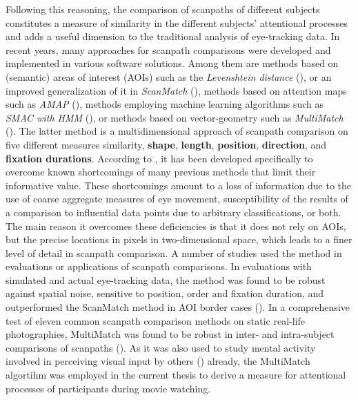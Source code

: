 \documentclass[a4paper, 12pt]{scrreprt}
\begin{document}
Following this reasoning, the comparison of scanpaths of different subjects constitutes a measure of similarity in the different subjects’ attentional processes and adds a useful dimension to the traditional analysis of eye-tracking data. \newline
In recent years, many approaches for scanpath comparisons were developed and implemented in various software solutions. Among them are methods based on (semantic) areas of interest (AOIs) such as the \textit{Levenshtein distance} (\cite{levenshtein1966binary}), or an improved generalization of it in \textit{ScanMatch} (\cite{cristino2010scanmatch}), methods based on attention maps such as \textit{AMAP} (\cite{ouerhani2004empirical}), methods employing machine learning algorithms such as \textit{SMAC with HMM} (\cite{coutrot2018scanpath}), or methods based on vector-geometry such as \textit{MultiMatch} (\cite{jarodzka2010vector}). The latter method is a multidimensional approach of scanpath comparison on five different measures similarity, \textbf{shape}, \textbf{length}, \textbf{position}, \textbf{direction}, and \textbf{fixation durations}. According to \textcite{jarodzka2010vector}, it has been developed specifically to overcome known shortcomings of many previous methods that limit their informative value. These shortcomings amount to a loss of information due to the use of coarse aggregate measures of eye movement, susceptibility of the results of a comparison to influential data points due to arbitrary classifications, or both. The main reason it overcomes these deficiencies is that it does not rely on AOIs, but the precise locations in pixels in two-dimensional space, which leads to a finer level of detail in scanpath comparison. \newline A number of studies used the method in evaluations or applications of scanpath comparisons. In evaluations with simulated and actual eye-tracking data, the method was found to be robust against spatial noise, sensitive to position, order and fixation duration, and outperformed the ScanMatch method in AOI border cases (\cite{dewhurst2012depends}). In a comprehensive test of eleven common scanpath comparison methods on static real-life photographies, MultiMatch was found to be robust in inter- and intra-subject comparisons of scanpaths (\cite{anderson2015comparison}). As it was also used to study mental activity involved in perceiving visual input by others (\cite{french2017evaluation}) already, the MultiMatch algortihm was employed in the current thesis to derive a measure for attentional processes of participants during movie watching. \newline
\end{document}
